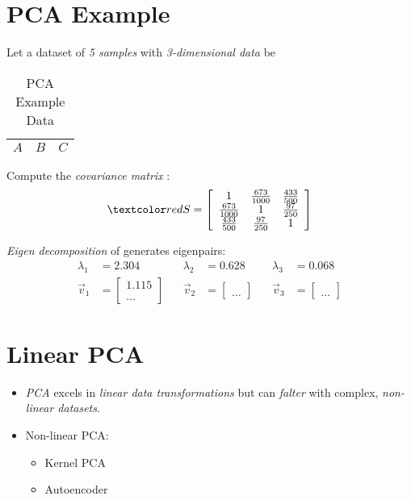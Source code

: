 \documentclass[
	number={7},
	title={Principal Component Analysis}
]{cs584notes}
\begin{document}
\section{PCA Example}\label{sec:pca-example}
Let a dataset of \emph{5 samples} with \emph{3-dimensional data} be
\begin{table}[H]
	\centering
	\caption{PCA Example Data}
	\label{tab:pca-example}
	\begin{tabular}{ccc}
		$A$ & $B$ & $C$\\
		\hline
	\end{tabular}
\end{table}

Compute the \emph{covariance matrix} :
\[ \data{S} = \left[ \begin{array}{ccc}
	1 & \frac{673}{1000} & \frac{433}{500}\\
	\frac{673}{1000} & 1 & \frac{97}{250}\\
	\frac{433}{500} & \frac{97}{250} & 1
\end{array} \right] \]

\emph{Eigen decomposition} of  generates eigenpairs:
\begin{equation*}
\begin{aligned}
	\lambda_{1} &= 2.304 \ \ & \ \ \lambda_{2} &= 0.628 \ \ & \ \ \lambda_{3} &= 0.068\\
	\vec{v}_{1} &= \left[ \begin{array}{c}
		1.115\\
		\\
		\dots
	\end{array} \right] \ \ & \ \ 	\vec{v}_{2} &= \left[ \begin{array}{c}
		\\
		\\
		\dots
	\end{array} \right] \ \ & \ \ 	\vec{v}_{3} &= \left[ \begin{array}{c}
		\\
		\\
		\dots
	\end{array} \right]
\end{aligned}
\end{equation*}

\section{Linear PCA}\label{sec:linear-pca}
\begin{itemize}
	\item \emph{PCA} excels in \emph{linear data transformations} but can \emph{falter} with complex, \emph{non-linear datasets}.
	\item Non-linear PCA:
	\begin{itemize}
		\item Kernel PCA
		\item Autoencoder
	\end{itemize}
\end{itemize}
\end{document}
